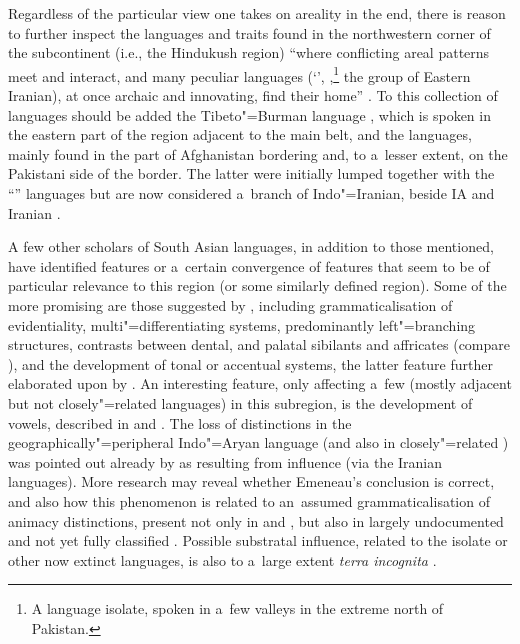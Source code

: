 Regardless of the particular view one takes on areality in the end, there is reason to further inspect the languages and traits found in the northwestern corner of the subcontinent (i.e., the Hindukush region) ``where conflicting areal patterns meet and interact, and many peculiar languages (`\iliDardic', \iliBurushaski,\footnote{A language isolate, spoken in a~few valleys in the extreme north of Pakistan.} the \iliPamir group of Eastern Iranian), at once archaic and innovating, find their home'' \citep[225]{masica2001}. To this collection of languages should be added the Tibeto"=Burman language \iliBalti, which is spoken in the eastern part of the region adjacent to the main \iliShina belt, and the \iliNuristani languages, mainly found in the part of Afghanistan bordering \iliChitral and, to a~lesser extent, on the Pakistani side of the border. The latter were initially lumped together with the ``\iliDardic'' languages but are now considered a~branch of Indo"=Iranian, beside IA and Iranian \citep{degener2002,strand2001}.


A few other scholars of South Asian languages, in addition to those mentioned, have identified features or a~certain convergence of features that seem to be of particular relevance to this region (or some similarly defined region). Some of the more promising are those suggested by \citet{bashir2003}, including grammaticalisation of evidentiality, multi"=differentiating  systems, predominantly left"=branching structures, contrasts between dental,  and palatal sibilants and affricates (compare \citealt{tikkanen2008}), and the development of tonal or accentual systems, the latter feature further elaborated upon by \citet{baart2014}. An interesting feature, only affecting a~few (mostly adjacent but not closely"=related languages) in this subregion, is the development of  vowels, described in \citet{morch1997} and \citet{heegardmorch2004}. The loss of  distinctions in the geographically"=peripheral Indo"=Aryan language \iliKhowar (and also in closely"=related \iliKalasha) was pointed out already by \citet{emeneau1965} as resulting from \iliPersian influence (via the Iranian \iliPamir languages). More research may reveal whether Emeneau's conclusion is correct, and also how this phenomenon is related to an~assumed grammaticalisation of animacy distinctions, present not only in \iliKhowar and \iliKalasha \citep[401]{bashir1988}, but also in largely undocumented and not yet fully classified \iliDameli \citep[4--6]{perder2013}. Possible substratal influence, related to the isolate \iliBurushaski or other now extinct languages, is also to a~large extent \textit{terra incognita} \citep{tikkanen1988}.



